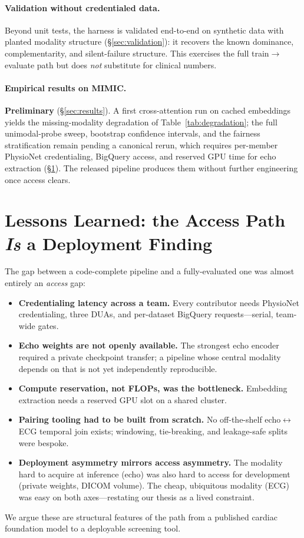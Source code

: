 \documentclass{article}
\begin{document}
\paragraph{Validation without credentialed data.} Beyond unit tests, the harness is validated
end-to-end on synthetic data with planted modality structure (\S\ref{sec:validation}): it recovers
the known dominance, complementarity, and silent-failure structure. This exercises the full
train$\rightarrow$evaluate path but does \emph{not} substitute for clinical numbers.

\paragraph{Empirical results on MIMIC.} \textbf{Preliminary} (\S\ref{sec:results}). A first
cross-attention run on cached embeddings yields the missing-modality degradation of
Table~\ref{tab:degradation}; the full unimodal-probe sweep, bootstrap confidence intervals, and the
fairness stratification remain pending a canonical rerun, which requires per-member PhysioNet
credentialing, BigQuery access, and reserved GPU time for echo extraction (\S\ref{sec:lessons}). The
released pipeline produces them without further engineering once access clears.

\section{Lessons Learned: the Access Path \emph{Is} a Deployment Finding}
\label{sec:lessons}
The gap between a code-complete pipeline and a fully-evaluated one was almost
entirely an \emph{access} gap:
\begin{itemize}
  \item \textbf{Credentialing latency across a team.} Every contributor needs PhysioNet
        credentialing, three DUAs, and per-dataset BigQuery requests---serial, team-wide gates.
  \item \textbf{Echo weights are not openly available.} The strongest echo encoder required a
        private checkpoint transfer; a pipeline whose central modality depends on that is not
        yet independently reproducible.
  \item \textbf{Compute reservation, not FLOPs, was the bottleneck.} Embedding extraction needs
        a reserved GPU slot on a shared cluster.
  \item \textbf{Pairing tooling had to be built from scratch.} No off-the-shelf echo$\leftrightarrow$ECG
        temporal join exists; windowing, tie-breaking, and leakage-safe splits were bespoke.
  \item \textbf{Deployment asymmetry mirrors access asymmetry.} The modality hard to acquire at
        inference (echo) was also hard to access for development (private weights, DICOM volume).
        The cheap, ubiquitous modality (ECG) was easy on both axes---restating our thesis as a
        lived constraint.
\end{itemize}
We argue these are structural features of the path from a published cardiac foundation model to
a deployable screening tool.
\end{document}
